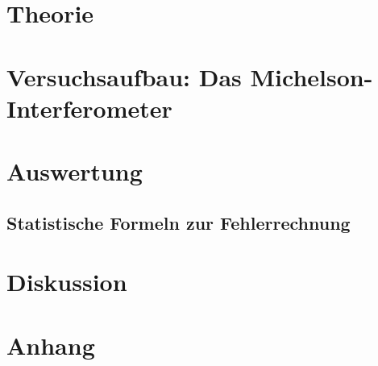 \documentclass[a4,11pt]{article}
\newcommand{\V}{V402}
\begin{document}



\tableofcontents
\clearpage


\section{Theorie}

\clearpage


\section{Versuchsaufbau: Das Michelson-Interferometer}

\clearpage


\section{Auswertung}
\subsection{Statistische Formeln zur Fehlerrechnung}
\label{sec:Fehlerrechnung}

%
\clearpage

\clearpage


\section{Diskussion}


\clearpage
\section{Anhang}
\listoftodos
\listoffigures
\listoftables
\nocite{\V}
\printbibliography[title = Literaturverzeichnis]
\end{document}
